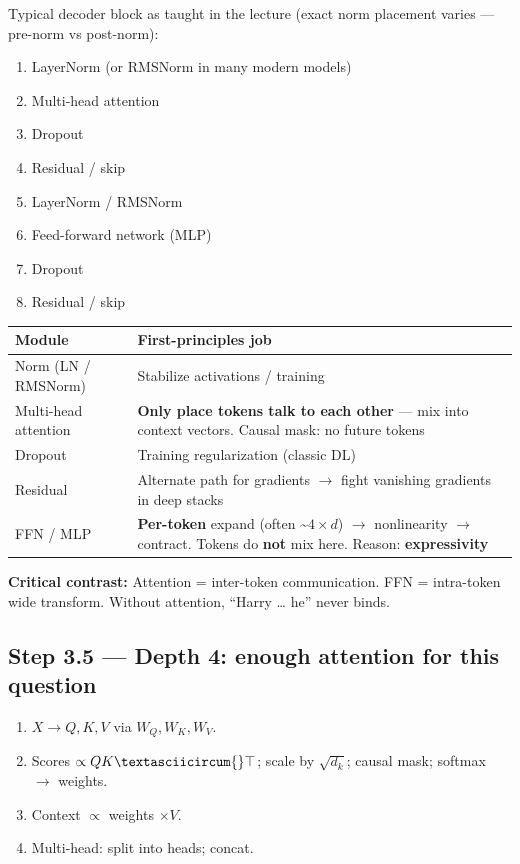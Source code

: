 \documentclass[11pt,a4paper]{article}
\begin{document}
Typical decoder block as taught in the lecture (exact norm placement varies --- pre-norm vs post-norm):


\begin{enumerate}
\item LayerNorm (or RMSNorm in many modern models)  
\item Multi-head attention  
\item Dropout  
\item Residual / skip  
\item LayerNorm / RMSNorm  
\item Feed-forward network (MLP)  
\item Dropout  
\item Residual / skip  
\end{enumerate}


\begin{table}[ht]
\centering\small
\begin{tabularx}{\textwidth}{@{}YY@{}}
\toprule
\textbf{Module} & \textbf{First-principles job} \\
\midrule
Norm (LN / RMSNorm) & Stabilize activations / training \\
Multi-head attention & \textbf{Only place tokens talk to each other} --- mix into context vectors. Causal mask: no future tokens \\
Dropout & Training regularization (classic DL) \\
Residual & Alternate path for gradients $\rightarrow$ fight vanishing gradients in deep stacks \\
FFN / MLP & \textbf{Per-token} expand (often \textasciitilde{}\(4\times d\)) $\rightarrow$ nonlinearity $\rightarrow$ contract. Tokens do \textbf{not} mix here. Reason: \textbf{expressivity} \\
\bottomrule
\end{tabularx}
\end{table}


\textbf{Critical contrast:} Attention = inter-token communication. FFN = intra-token wide transform. Without attention, ``Harry \ldots{} he'' never binds.


\subsection{Step 3.5 --- Depth 4: enough attention for this question}


\begin{enumerate}
\item \(X \rightarrow Q,K,V\) via \(W_Q,W_K,W_V\).  
\item Scores \(\propto QK\textasciicircum{}\top\); scale by \(\sqrt{d_k}\); causal mask; softmax $\rightarrow$ weights.  
\item Context \(\propto\) weights \(\times V\).  
\item Multi-head: split into heads; concat.
\end{enumerate}
\end{document}
